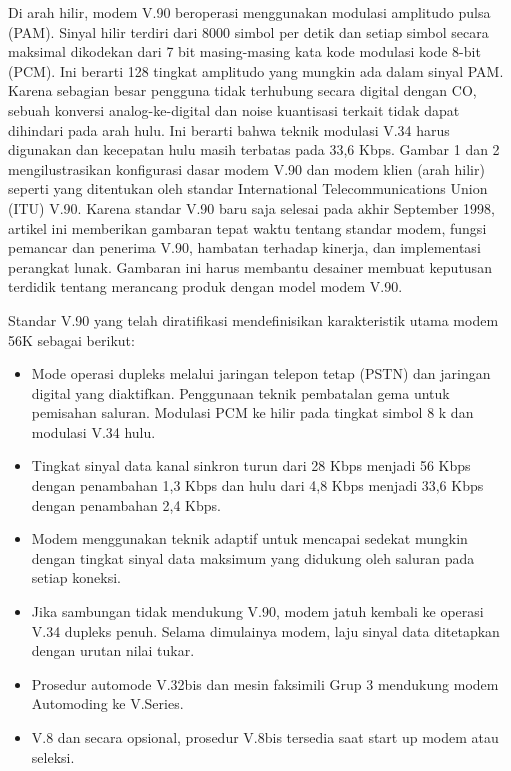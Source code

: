 Di arah hilir, modem V.90 beroperasi menggunakan modulasi amplitudo pulsa (PAM). Sinyal hilir terdiri dari 8000 simbol per detik dan setiap simbol secara maksimal dikodekan dari 7 bit masing-masing kata kode modulasi kode 8-bit (PCM). Ini berarti 128 tingkat amplitudo yang mungkin ada dalam sinyal PAM. Karena sebagian besar pengguna tidak terhubung secara digital dengan CO, sebuah konversi analog-ke-digital dan noise kuantisasi terkait tidak dapat dihindari pada arah hulu. Ini berarti bahwa teknik modulasi V.34 harus digunakan dan kecepatan hulu masih terbatas pada 33,6 Kbps. Gambar 1 dan 2 mengilustrasikan konfigurasi dasar modem V.90 dan modem klien (arah hilir) seperti yang ditentukan oleh standar International Telecommunications Union (ITU) V.90.
Karena standar V.90 baru saja selesai pada akhir September 1998, artikel ini memberikan gambaran tepat waktu tentang standar modem, fungsi pemancar dan penerima V.90, hambatan terhadap kinerja, dan implementasi perangkat lunak. Gambaran ini harus membantu desainer membuat keputusan terdidik tentang merancang produk dengan model modem V.90.

Standar V.90 yang telah diratifikasi mendefinisikan karakteristik utama modem 56K sebagai berikut: 
\begin{itemize}
\item Mode operasi dupleks melalui jaringan telepon tetap (PSTN) dan jaringan digital yang diaktifkan. Penggunaan teknik pembatalan gema untuk pemisahan saluran. Modulasi PCM ke hilir pada tingkat simbol 8 k dan modulasi V.34 hulu.
\item Tingkat sinyal data kanal sinkron turun dari 28 Kbps menjadi 56 Kbps dengan penambahan 1,3 Kbps dan hulu dari 4,8 Kbps menjadi 33,6 Kbps dengan penambahan 2,4 Kbps.
\item Modem menggunakan teknik adaptif untuk mencapai sedekat mungkin dengan tingkat sinyal data maksimum yang didukung oleh saluran pada setiap koneksi. 
\item Jika sambungan tidak mendukung V.90, modem jatuh kembali ke operasi V.34 dupleks penuh. Selama dimulainya modem, laju sinyal data ditetapkan dengan urutan nilai tukar.
\item Prosedur automode V.32bis dan mesin faksimili Grup 3 mendukung modem Automoding ke V.Series. 
\item V.8 dan secara opsional, prosedur V.8bis tersedia saat start up modem atau seleksi. \cite{gao1998introduction} 
\end{itemize}
